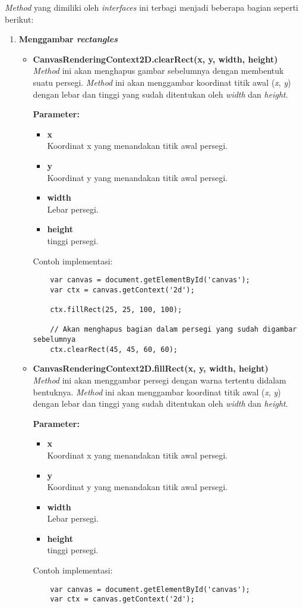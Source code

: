 \textit{Method} yang dimiliki oleh \textit{interfaces} ini terbagi menjadi beberapa bagian seperti berikut:
\begin{enumerate}
	\item \textbf{Menggambar \textit{rectangles}}
	\begin{itemize}
		\item \textbf{CanvasRenderingContext2D.clearRect(x, y, width, height)} \\ 
		\textit{Method} ini akan menghapus gambar sebelumnya dengan membentuk suatu persegi. \textit{Method} ini akan menggambar koordinat titik awal (\textit{x}, \textit{y}) dengan lebar dan tinggi yang sudah ditentukan oleh \textit{width} dan \textit{height}. 
		
		\textbf{Parameter:}
		\begin{itemize}
			\item \textbf{x} \\ Koordinat x yang menandakan titik awal persegi.
			\item \textbf{y} \\ Koordinat y yang menandakan titik awal persegi.
			\item \textbf{width} \\ Lebar persegi.
			\item \textbf{height} \\ tinggi persegi.
		\end{itemize}
		Contoh implementasi:
	\begin{lstlisting}
	var canvas = document.getElementById('canvas');
	var ctx = canvas.getContext('2d');
		
	ctx.fillRect(25, 25, 100, 100);
	
	// Akan menghapus bagian dalam persegi yang sudah digambar sebelumnya
	ctx.clearRect(45, 45, 60, 60); 
	\end{lstlisting}
		
		\item \textbf{CanvasRenderingContext2D.fillRect(x, y, width, height)} \\ 
		\textit{Method} ini akan menggambar persegi dengan warna tertentu didalam bentuknya. \textit{Method} ini akan menggambar koordinat titik awal (\textit{x}, \textit{y}) dengan lebar dan tinggi yang sudah ditentukan oleh \textit{width} dan \textit{height}. 
		
		\textbf{Parameter:}
		\begin{itemize}
			\item \textbf{x} \\ Koordinat x yang menandakan titik awal persegi.
			\item \textbf{y} \\ Koordinat y yang menandakan titik awal persegi.
			\item \textbf{width} \\ Lebar persegi.
			\item \textbf{height} \\ tinggi persegi.
		\end{itemize}
		Contoh implementasi:
	\begin{lstlisting}
	var canvas = document.getElementById('canvas');
	var ctx = canvas.getContext('2d');
	

\end{lstlisting}
\end{itemize}
\end{enumerate}
